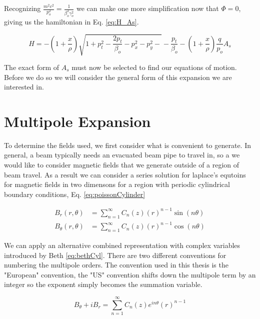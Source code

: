 Recognizing $\frac{m^2c^2}{p_o^2} = \frac{1}{\beta_o^2 \gamma_o^2}$ we can make one more simplification now that $\Phi = 0$, giving us the hamiltonian in Eq. \ref{eq:H_As}.

\begin{equation} \label{eq:H_As}
	H = -\left(1 + \frac{x}{\rho}\right)\sqrt{1 + p_t^2 - \frac{2 p_t}{\beta_o} - p_x^2 - p_y^2- } - \frac{p_t}{\beta_o} - \left(1 + \frac{x}{\rho}\right)\frac{q}{p_o}A_s
\end{equation}

The exact form of $A_s$ must now be selected to find our equations of motion. Before we do so we will consider the general form of this expansion we are interested in.

\section{Multipole Expansion} \label{sec:multipole}

To determine the fields used, we first consider what is convenient to generate. In general, a beam typically needs an evacuated beam pipe to travel in, so a we would like to consider magnetic fields that we generate outside of a region of beam travel. As a result we can consider a series solution for laplace's equtoins for magnetic fields in two dimensons for a region with periodic cylindrical boundary conditions, Eq. \ref{eq:poissonCylinder}

\begin{equation} \label{eq:poissonCylinder}
\begin{split}
	B_r(r,\theta) &= \sum_{n=1}^{\infty} C_n(z) \left( r \right)^{n-1} \sin{(n\theta)}\\
	B_\theta(r,\theta) &= \sum_{n=1}^{\infty} C_n(z) \left( r \right)^{n-1} \cos{(n\theta)}
\end{split}
\end{equation}

We can apply an alternative combined representation with complex variables introduced by Beth \cite{Beth} \ref{eq:bethCyl}. There are two different conventions for numbering the multipole orders. The convention used in this thesis is the "European" convention, the "US" convention shifts down the multipole term by an integer so the exponent simply becomes the summation variable.

\begin{equation} \label{eq:bethCyl}
	B_{\theta} + i B_r = \sum_{n=1}^{\infty} C_n(z) e^{in\theta} \left( r \right)^{n-1}
\end{equation}

